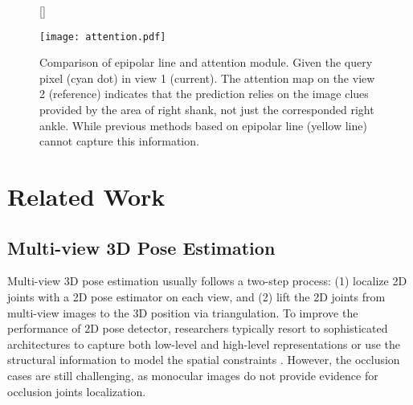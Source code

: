\documentclass{bmvc2k}
\begin{document}
\begin{figure}[!t]
[\FBwidth]
{\caption{ \footnotesize{Comparison of epipolar line and attention module. Given the query pixel (cyan dot) in view 1 (current). The attention map on the view 2 (reference) indicates that the prediction relies on the image clues provided by the area of right shank, not just the corresponded right ankle. While previous methods based on epipolar line (yellow line) cannot capture this information.   }}\label{fig:test}}
{\texttt{[image: attention.pdf]}}
\label{fig:att_map}
\end{figure}



\section{Related Work}
\vspace{-0.7em}
\subsection{Multi-view 3D Pose Estimation}
\vspace{-0.6em}
Multi-view 3D pose estimation usually follows a two-step process: (1) localize 2D joints with a 2D pose estimator on each view, and (2) lift the 2D joints from multi-view images to the 3D position via triangulation. 
To improve the performance of 2D pose detector, researchers typically resort to sophisticated architectures to capture both low-level and high-level representations  \cite{wei2016convolutional, chen2018cascaded, newell2016stacked, xiao2018simple, sun2019deep} or use the structural information to model the spatial constraints \cite{tompson2014joint, kong2019adaptive, kong2020rotation, kong2020sia, chen2020nonparametric}. However, the occlusion cases are still challenging, as monocular images do not provide evidence for occlusion joints localization. 
\end{document}
